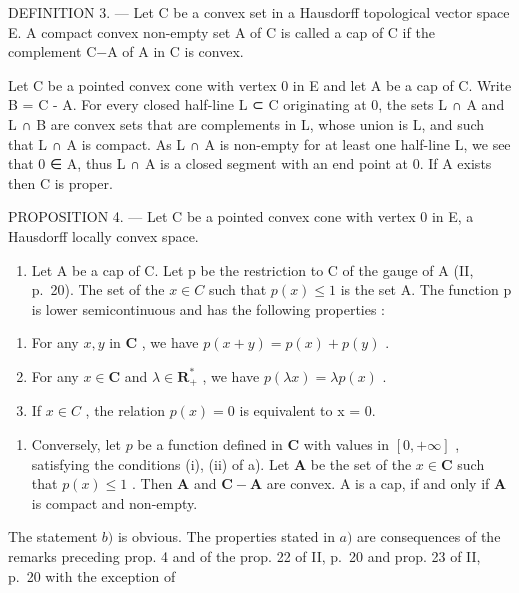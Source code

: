 DEFINITION 3. --- Let C be a convex set in a Hausdorff topological vector space E. A compact convex non-empty set A of C is called a cap of C if the complement C−A of A in C is convex.

Let C be a pointed convex cone with vertex 0 in E and let A be a cap of C. Write B = C - A. For every closed half-line L ⊂ C originating at 0, the sets L ∩ A and L ∩ B are convex sets that are complements in L, whose union is L, and such that L ∩ A is compact. As L ∩ A is non-empty for at least one half-line L, we see that 0 ∈ A, thus L ∩ A is a closed segment with an end point at 0. If A exists then C is proper.

PROPOSITION 4. --- Let C be a pointed convex cone with vertex 0 in E, a Hausdorff locally convex space.

\begin{enumerate}
\def\labelenumi{\alph{enumi})}
\tightlist
\item
  Let A be a cap of C. Let p be the restriction to C of the gauge of A (II, p.~20). The set of the \(x \in C\) such that \(p(x) \leqslant 1\) is the set A. The function p is lower semicontinuous and has the following properties :
\end{enumerate}

\begin{enumerate}
\def\labelenumi{(\roman{enumi})}
\item
  For any \(x, y\) in \(\mathbf{C}\) , we have \(p(x + y) = p(x) + p(y)\) .
\item
  For any \(x \in \mathbf{C}\) and \(\lambda \in \mathbf{R}_{+}^{*}\) , we have \(p(\lambda x) = \lambda p(x)\) .
\item
  If \(x \in C\) , the relation \(p(x) = 0\) is equivalent to x = 0.
\end{enumerate}

\begin{enumerate}
\def\labelenumi{\alph{enumi})}
\setcounter{enumi}{1}
\tightlist
\item
  Conversely, let \(p\) be a function defined in \(\mathbf{C}\) with values in \([0, +\infty]\) , satisfying the conditions (i), (ii) of a). Let \(\mathbf{A}\) be the set of the \(x \in \mathbf{C}\) such that \(p(x) \leqslant 1\) . Then \(\mathbf{A}\) and \(\mathbf{C} - \mathbf{A}\) are convex. A is a cap, if and only if \(\mathbf{A}\) is compact and non-empty.
\end{enumerate}

The statement \(b)\) is obvious. The properties stated in \(a)\) are consequences of the remarks preceding prop. 4 and of the prop. 22 of II, p.~20 and prop. 23 of II, p.~20 with the exception of

